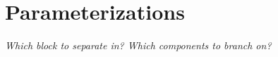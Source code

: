 \section{Parameterizations}\label{sec:cmpbnd_parameterizations}
\textit{Which block to separate in? Which components to branch on?}